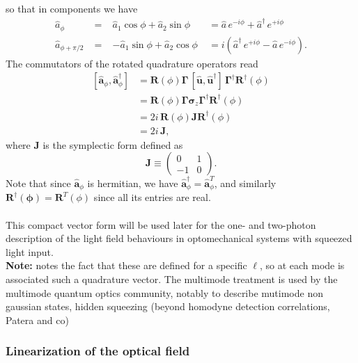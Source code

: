 so that in components we have 
\begin{equation}
\begin{alignedat}{3}
\hat a_\phi \;&=\;& \hat a_1 \cos\phi + \hat a_2 \sin\phi \;&= \hat a\,e^{-i\phi} + \hat a^\dagger\,e^{+i\phi}\\
\hat a_{\phi+\pi/2} \;&=\;& -\hat a_1 \sin\phi + \hat a_2 \cos\phi \;&= i\!\left(\hat a^\dagger\,e^{+i\phi} - \hat a\,e^{-i\phi}\right).
\end{alignedat}
\end{equation}
The commutators of the rotated quadrature operators read
\begin{equation}
\begin{aligned}
[\hat{\mathbf{a}}_\phi , \hat{\mathbf{a}}_\phi^{\dagger}]
&= \mathbf R(\phi) \mathbf \Gamma\,[\hat{\mathbf{u}},\hat{\mathbf{u}}^{\dagger}]\, \mathbf \Gamma^{\dagger} \mathbf R^{\dagger}(\phi) \\[4pt]
&= \mathbf R(\phi)\mathbf \Gamma \mathbf \sigma_z \mathbf \Gamma^{\dagger} \mathbf R^{\dagger}(\phi) \\[4pt]
&= 2i\, \mathbf R(\phi) \mathbf J \mathbf R^{\dagger}(\phi) \\[4pt]
&= 2i\,\mathbf J,
\end{aligned}
\end{equation}
where $\mathbf{J}$ is the symplectic form defined as
\begin{equation}
\mathbf{J} \equiv
\begin{pmatrix}
0 & 1 \\
-1 & 0
\end{pmatrix}.
\end{equation}
Note that since $\hat{\mathbf{a}}_\phi$ is hermitian, we have $\hat{\mathbf{a}}_\phi^\dagger = \hat{\mathbf{a}}_\phi^T$, and similarly $\mathbf{R^\dagger(\phi)} = \mathbf{R}^T(\phi)$ since all its entries are real. \\ 
\\
This compact vector form will be used later for the one- and two-photon description of the light field behaviours in optomechanical systems with squeezed light input. \\
\noindent \textbf{Note:} \color{red} notes the fact that these are defined for a specific $\ell$, so at each mode is associated such a quadrature vector. The multimode treatment is used by the multimode quantum optics community, notably to describe mutimode non gaussian states, hidden squeezing (beyond homodyne detection correlations, Patera and co) \color{black}
\subsubsection{Linearization of the optical field}

